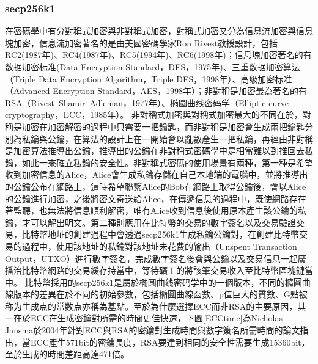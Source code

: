			\subsubsection{secp256k1}
			在密碼學中有分對稱式加密與非對稱式加密，對稱式加密又分為信息流加密與信息塊加密，信息流加密著名的是由美國密碼學家Ron Rivest教授設計，包括RC2(1987年)\parencite{OnthedesignandsecurityofRC2}、RC4(1987年)\parencite{Rc4}、RC5(1994年)\parencite{TheRC5encryptionalgorithm}、RC6(1998年)\parencite{TheRC6blockcipher.v1.1August201998}；信息塊加密著名的有数据加密标准(Data Encryption Standard，DES，1975年)\parencite{Dataencryptionstandard}、三重数据加密算法（Triple Data Encryption Algorithm，Triple DES，1998年）\parencite{TrippleDataEncryptionAlgorithmModesofOperation}、高级加密标准（Advanced Encryption Standard，AES，1998年）\parencite{ThedesignofRijndael:AES-theadvancedencryptionstandard}；非對稱是加密最為著名的有RSA（Rivest–Shamir–Adleman，1977年）\parencite{Cryptographiccommunicationssystemandmethod}、椭圆曲线密码学（Elliptic curve cryptography，ECC，1985年）\parencite{Ellipticcurvecryptosystems}。
			非對稱式加密與對稱式加密最大的不同在於，對稱是加密在加密解密的過程中只需要一把鑰匙，而非對稱是加密會生成兩把鑰匙分別為私鑰與公鑰，在算法的設計上在一開始會以亂數產生一把私鑰，再經由非對稱是加密算法推導出公鑰，推導出的公鑰在非對稱式密碼學中是相當難以到推回去私鑰，如此一來確立私鑰的安全性。非對稱式密碼的使用場景有兩種，第一種是希望收到加密信息的Alice，Alice會生成私鑰存儲在自己本地端的電腦中，並將推導出的公鑰公布在網路上，這時希望聯繫Alice的Bob在網路上取得公鑰後，會以Alice的公鑰進行加密，之後將密文寄送給Alice，在傳遞信息的過程中，既使網路存在著監聽，也無法將信息順利解密，唯有Alice收到信息後使用原本產生該公鑰的私鑰，才可以解出明文。第二種則應用在比特幣的交易的數字簽名以及交易驗證交易，比特幣地址的創建過程中會透過secp256k1生成私鑰公鑰對，在創建比特幣交易的過程中，使用該地址的私鑰對該地址未花费的输出（Unspent Transaction Output，UTXO）進行數字簽名，完成數字簽名後會與公鑰以及交易信息一起廣播治比特幣網路的交易緩存持當中，等待礦工的將該筆交易收入至比特幣區塊鏈當中。
			比特幣採用的secp256k1是屬於椭圆曲线密码学中的一個版本，不同的橢圓曲線版本的差異在於不同的初始參數，包括橢圓曲線函數、p值巨大的質數、G點被称为⽣成点的常数点亦稱為基點。至於為什麼選擇ECC而非RSA的主要原因，其一在於ECC在生成密鑰對所需的時間更佳快速，下圖\ref{ECCtime}為Nicholas Jansma於2004年針對ECC與RSA的密鑰對生成時間與數字簽名所需時間的論文\parencite{Performancecomparisonofellipticcurveandrsadigitalsignatures}指出，當ECC產生571bit的密鑰長度，RSA要達到相同的安全性需要生成15360bit，至於生成的時間差距高達471倍。
			
